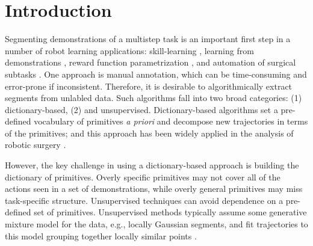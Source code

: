 \section{Introduction}
Segmenting demonstrations of a multistep task is an important first step in a number of robot learning applications: skill-learning \cite{calinon2010learning, kruger2010learning, konidaris2011robot}, learning from demonstrations \cite{Niekum2015learning}, reward function parametrization \cite{hanlearning}, and automation of surgical subtasks \cite{murali2015learning}.
One approach is manual annotation, which can be time-consuming and error-prone if inconsistent.
Therefore, it is desirable to algorithmically extract segments from unlabled data.
Such algorithms fall into two broad categories: (1) dictionary-based, (2) and unsupervised.
Dictionary-based algorithms set a pre-defined vocabulary of primitives \emph{a priori} and decompose new trajectories in terms of the primitives; and this approach has been widely applied in the analysis of robotic surgery \cite{lea15improved,zappella2013surgical}.

However, the key challenge in using a dictionary-based approach is building the dictionary of primitives. 
Overly specific primitives may not cover all of the actions seen in a set of demonstrations, while overly general primitives may miss task-specific structure.
Unsupervised techniques can avoid dependence on a pre-defined set of primitives.
Unsupervised methods typically assume some generative mixture model for the data, e.g., locally Gaussian segments, and fit trajectories to this model grouping together locally similar points \cite{calinon2010learning, krishnan2015tsc, calinon2004stochastic, kruger2010learning, fox2009nonparametric, oh2005learning}.


